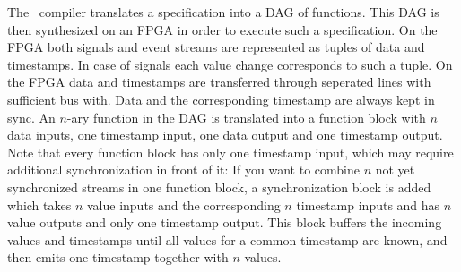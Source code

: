 The \tessla\ compiler translates a specification into a DAG of functions.
This DAG is then synthesized on an FPGA in order to execute such a specification.
On the FPGA both signals and event streams are represented
as tuples of data and timestamps.
In case of signals each value change corresponds to such a tuple.
On the FPGA data and timestamps are transferred through seperated lines
with sufficient bus with.
Data and the corresponding timestamp are always kept in sync.
An $n$-ary function in the DAG is translated into a function block with $n$ data inputs,
one timestamp input, one data output and one timestamp output.
Note that every function block has only one timestamp input,
which may require additional synchronization in front of it:
If you want to combine $n$ not yet synchronized streams in one function block,
a synchronization block is added which takes $n$ value inputs and the corresponding $n$ timestamp inputs
and has $n$ value outputs and only one timestamp output.
This block buffers the incoming values and timestamps until all values for a common timestamp are known,
and then emits one timestamp together with $n$ values.
